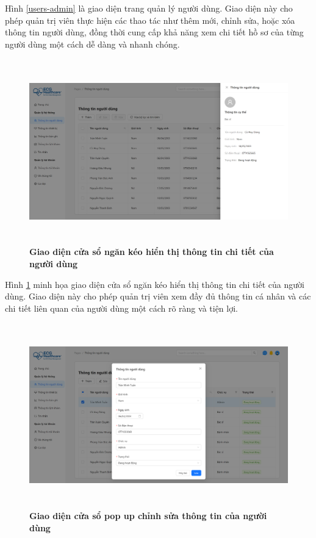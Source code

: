 Hình \ref{users-admin} là giao diện trang quản lý người dùng. Giao diện này cho phép quản trị viên thực hiện các thao tác như thêm mới,
chỉnh sửa, hoặc xóa thông tin người dùng, đồng thời cung cấp khả năng xem chi tiết hồ sơ của từng người dùng một cách dễ dàng và nhanh chóng.

\begin{figure}[H]
	\centering
	\includegraphics[width=15cm,height=8cm]{Images/admin_ui/user-info.png}
	\caption[Giao diện cửa sổ ngăn kéo hiển thị thông tin chi tiết của người dùng]{\bfseries \fontsize{12pt}{0pt}\selectfont Giao diện cửa sổ ngăn kéo hiển thị thông tin chi tiết của người dùng}
	\label{user-info-admin}
\end{figure}

Hình \ref{user-info-admin} minh họa giao diện cửa sổ ngăn kéo hiển thị thông tin chi tiết của người dùng. Giao diện này
cho phép quản trị viên xem đầy đủ thông tin cá nhân và các chi tiết liên quan của người dùng một cách rõ ràng và tiện lợi.

\begin{figure}[H]
	\centering
	\includegraphics[width=15cm,height=8cm]{Images/admin_ui/user-detail.png}
	\caption[Giao diện cửa sổ pop up chỉnh sửa thông tin của người dùng]{\bfseries \fontsize{12pt}{0pt}\selectfont Giao diện cửa sổ pop up chỉnh sửa thông tin của người dùng}
	\label{user-detail-admin}
\end{figure}

